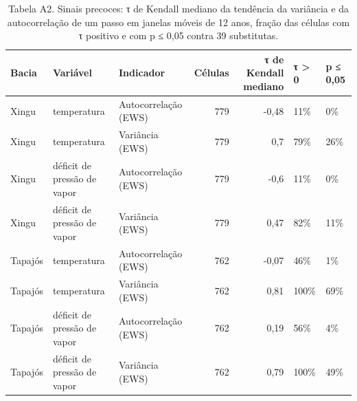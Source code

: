 \begin{table}
\caption{Tabela A2. Sinais precoces: τ de Kendall mediano da tendência da variância e da autocorrelação de um passo em janelas móveis de 12 anos, fração das células com τ positivo e com p ≤ 0,05 contra 39 substitutas.}
\label{tab:07_descritores::ews_resumo}
\begin{tabular}{lllrrll}
\toprule
Bacia & Variável & Indicador & Células & τ de Kendall mediano & τ > 0 & p ≤ 0,05 \\
\midrule
Xingu & temperatura & Autocorrelação (EWS) & 779 & -0,48 & 11\% & 0\% \\
Xingu & temperatura & Variância (EWS) & 779 & 0,7 & 79\% & 26\% \\
Xingu & déficit de pressão de vapor & Autocorrelação (EWS) & 779 & -0,6 & 11\% & 0\% \\
Xingu & déficit de pressão de vapor & Variância (EWS) & 779 & 0,47 & 82\% & 11\% \\
Tapajós & temperatura & Autocorrelação (EWS) & 762 & -0,07 & 46\% & 1\% \\
Tapajós & temperatura & Variância (EWS) & 762 & 0,81 & 100\% & 69\% \\
Tapajós & déficit de pressão de vapor & Autocorrelação (EWS) & 762 & 0,19 & 56\% & 4\% \\
Tapajós & déficit de pressão de vapor & Variância (EWS) & 762 & 0,79 & 100\% & 49\% \\
\bottomrule
\end{tabular}
\end{table}
